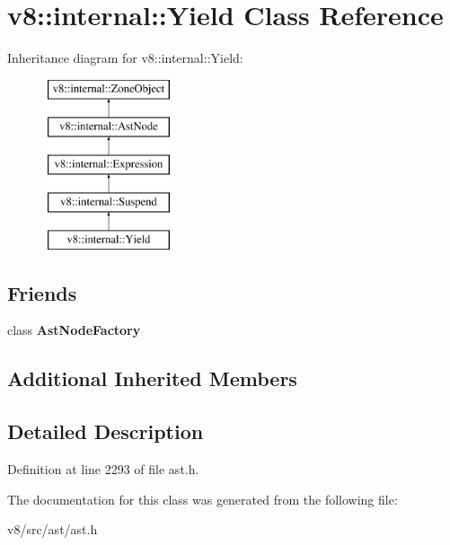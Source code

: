 \hypertarget{classv8_1_1internal_1_1Yield}{}\section{v8\+:\+:internal\+:\+:Yield Class Reference}
\label{classv8_1_1internal_1_1Yield}
Inheritance diagram for v8\+:\+:internal\+:\+:Yield\+:\begin{figure}[H]
\begin{center}
\leavevmode
\includegraphics[height=5.000000cm]{classv8_1_1internal_1_1Yield}
\end{center}
\end{figure}
\subsection*{Friends}
\begin{DoxyCompactItemize}
\item 
\mbox{\label{classv8_1_1internal_1_1Yield_a8d587c8ad3515ff6433eb83c578e795f}} 
class {\bfseries Ast\+Node\+Factory}
\end{DoxyCompactItemize}
\subsection*{Additional Inherited Members}


\subsection{Detailed Description}


Definition at line 2293 of file ast.\+h.



The documentation for this class was generated from the following file\+:\begin{DoxyCompactItemize}
\item 
v8/src/ast/ast.\+h\end{DoxyCompactItemize}
